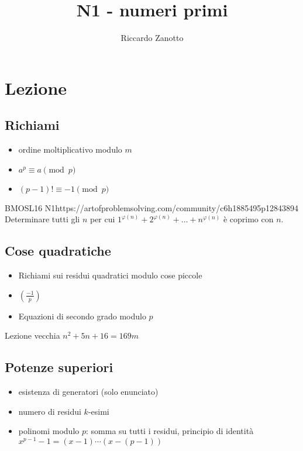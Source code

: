 \documentclass[12pt]{article}
\author{Riccardo Zanotto}
\title{N1 - numeri primi}
\begin{document}
\maketitle


\section{Lezione}

\subsection{Richiami}
\begin{itemize}
    \item ordine moltiplicativo modulo $m$
    \item $a^p\equiv a\pmod p$
    \item $(p-1)!\equiv-1\pmod p$
\end{itemize}

\begin{esercizio}{BMOSL16 N1}{https://artofproblemsolving.com/community/c6h1885495p12843894}
    Determinare tutti gli $n$ per cui $1^{\varphi(n)}+2^{\varphi(n)}+\dots+n^{\varphi(n)}$ è coprimo con $n$.
\end{esercizio}

\subsection{Cose quadratiche}

\begin{itemize}
    \item Richiami sui residui quadratici modulo cose piccole
    \item $\left( \frac{-1}{p} \right)$
    \item Equazioni di secondo grado modulo $p$
\end{itemize}

\begin{esercizio}{Lezione vecchia}{}
    $n^2+5n+16=169m$
\end{esercizio}

\subsection{Potenze superiori}
\begin{itemize}
    \item esistenza di generatori (solo enunciato)
    \item numero di residui $k$-esimi
    \item polinomi modulo $p$: somma su tutti i residui, principio di identità $x^{p-1}-1=(x-1)\cdots(x-(p-1))$
\end{itemize}
\end{document}
